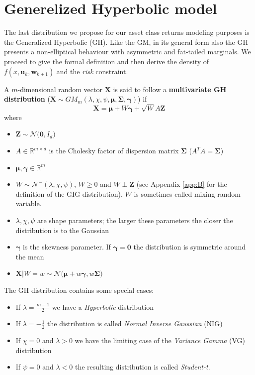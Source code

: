 \section{Generelized Hyperbolic model}
The last distribution we propose for our asset class returns modeling purposes is the Generalized Hyperbolic (GH). Like the GM, in its general form also the GH presents a non-elliptical behaviour with asymmetric and fat-tailed marginals. We proceed to give the formal definition and then derive the density of $f(x,\bm{u}_k,\bm{w}_{k+1})$
and the \textit{risk} constraint.
\begin{definition}[GH distribution]\label{def:GH}
	A $m$-dimensional random vector $\bm{X}$ is said to follow a \textbf{multivariate GH distribution} ($\bm{X} \sim GM_m(\lambda,\chi,\psi,\bm{\mu},\bm{\Sigma},\bm{\gamma})$) if \[ \bm{X} = \bm{\mu}+W\bm{\gamma}+\sqrt{W}A\bm{Z} \] where 
	\begin{itemize}
		\item $\bm{Z} \sim \mathcal{N}\big(\bm{0},I_d\big)$
		\item $A \in \mathbb{R}^{m \times d} $ is the Cholesky factor of dispersion matrix $\bm{\Sigma}$ ($A^TA = \bm{\Sigma}$)
		\item $\bm{\mu}, \bm{\gamma} \in \mathbb{R}^m$
		\item $W \sim \mathcal{N}^-(\lambda,\chi,\psi)$, $W \geq 0$ and $W \perp \bm{Z}$ (see Appendix \ref{app:B} for the definition of the GIG distribution). $W$ is sometimes called mixing random variable.
	\end{itemize}
\end{definition}
\begin{remark}
	\begin{itemize}
		\item $\lambda,\chi,\psi$ are shape parameters; the larger these parameters the closer the distribution is to the Gaussian
		\item $\bm{\gamma}$ is the skewness parameter. If $\bm{\gamma}= \bm{0}$ the distribution is symmetric around the mean
		\item $\bm{X}\lvert W = w \sim \mathcal{N}\big(\bm{\mu}+w\bm{\gamma},w\bm{\Sigma}\big)$
	\end{itemize}
\end{remark}
The GH distribution contains some special cases:
\begin{itemize}
	\item If $\lambda=\frac{m+1}{2}$ we have a \textit{Hyperbolic} distribution
	\item If $\lambda=-\frac{1}{2}$ the distribution is called \textit{Normal Inverse Gaussian} (NIG)
	\item If $\chi = 0$ and $\lambda > 0$ we have the limiting case of the \textit{Variance Gamma} (VG) distribution
	\item If $\psi = 0$ and $\lambda < 0$ the resulting distribution is called \textit{Student-t}.
\end{itemize}
	
